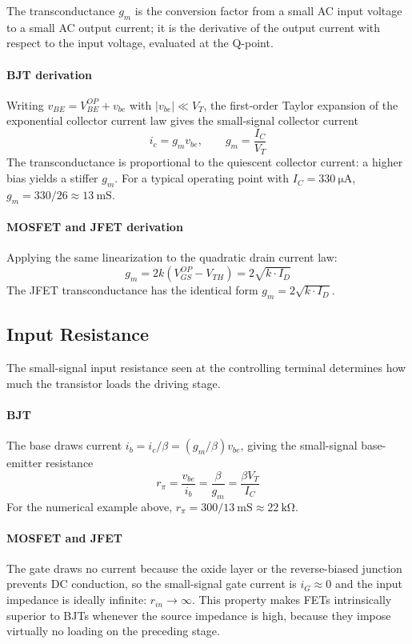 The transconductance \(g_m\) is the conversion factor from a small AC input voltage to a small AC output current; it is the derivative of the output current with respect to the input voltage, evaluated at the Q-point.

\paragraph{BJT derivation} Writing \(v_{BE} = V_{BE}^{OP} + v_{be}\) with \(|v_{be}| \ll V_T\), the first-order Taylor expansion of the exponential collector current law gives the small-signal collector current
\[
i_c = g_m v_{be}, \qquad g_m = \frac{I_C}{V_T}
\]
The transconductance is proportional to the quiescent collector current: a higher bias yields a stiffer \(g_m\).
For a typical operating point with \(I_C = \SI{330}{\micro\ampere}\), \(g_m = 330/26 \approx \SI{13}{\milli\siemens}\).

\paragraph{MOSFET and JFET derivation} Applying the same linearization to the quadratic drain current law:
\[
g_m = 2k(V_{GS}^{OP} - V_{TH}) = 2\sqrt{k \cdot I_D}
\]
The JFET transconductance has the identical form \(g_m = 2\sqrt{k \cdot I_D}\).

\subsection{Input Resistance}
\label{ssc:732}

The small-signal input resistance seen at the controlling terminal determines how much the transistor loads the driving stage.

\paragraph{BJT} The base draws current \(i_b = i_c/\beta = (g_m/\beta)v_{be}\), giving the small-signal base-emitter resistance
\[
r_\pi = \frac{v_{be}}{i_b} = \frac{\beta}{g_m} = \frac{\beta V_T}{I_C}
\]
For the numerical example above, \(r_\pi = 300/\SI{13}{\milli\siemens} \approx \SI{22}{\kilo\ohm}\).

\paragraph{MOSFET and JFET} The gate draws no current because the oxide layer or the reverse-biased junction prevents DC conduction, so the small-signal gate current is \(i_G \approx 0\) and the input impedance is ideally infinite: \(r_{in} \to \infty\).
This property makes FETs intrinsically superior to BJTs whenever the source impedance is high, because they impose virtually no loading on the preceding stage.

